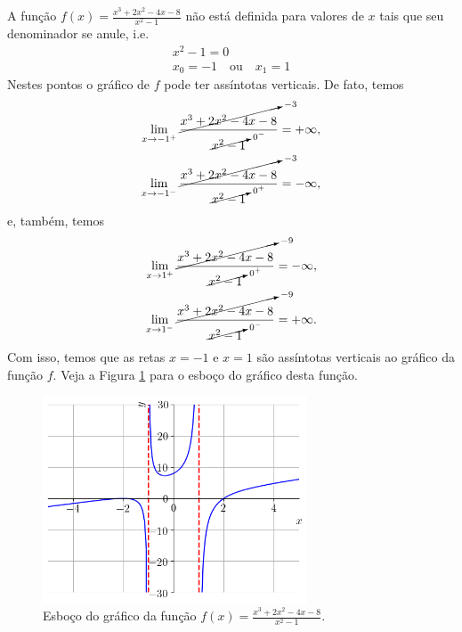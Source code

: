 \begin{ex}
  A função $\displaystyle f(x) = \frac{x^3 + 2x^2 - 4x - 8}{x^2 - 1}$ não está definida para valores de $x$ tais que seu denominador se anule, i.e.
    \begin{gather}
      x^2 - 1 = 0\\
      x_0=-1\quad\text{ou}\quad x_1=1
    \end{gather}
    Nestes pontos o gráfico de $f$ pode ter assíntotas verticais. De fato, temos
    \begin{align}
      \lim_{x\to -1^+} \frac{\cancelto{-3}{x^3 + 2x^2 - 4x - 8}}{\cancelto{0^-}{x^2-1}} &=  +\infty,\\
      \lim_{x\to -1^-} \frac{\cancelto{-3}{x^3 + 2x^2 - 4x - 8}}{\cancelto{0^+}{x^2-1}} &=  -\infty,
    \end{align}
    e, também, temos
    \begin{align}
      \lim_{x\to 1^+} \frac{\cancelto{-9}{x^3 + 2x^2 - 4x - 8}}{\cancelto{0^+}{x^2-1}} &= -\infty,\\      
      \lim_{x\to 1^-} \frac{\cancelto{-9}{x^3 + 2x^2 - 4x - 8}}{\cancelto{0^-}{x^2-1}} &= +\infty.
    \end{align}
    Com isso, temos que as retas $x=-1$ e $x=1$ são assíntotas verticais ao gráfico da função $f$. Veja a Figura \ref{fig:ex_lim_assvert_racio} para o esboço do gráfico desta função.

    \begin{figure}[H]
      \centering
      \includegraphics[width=0.7\textwidth]{./cap_lim/dados/fig_ex_lim_assvert_racio/fig}
      \caption{Esboço do gráfico da função $\displaystyle f(x) = \frac{x^3 + 2x^2 - 4x - 8}{x^2 - 1}$.}
      \label{fig:ex_lim_assvert_racio}
    \end{figure}
\end{ex}

